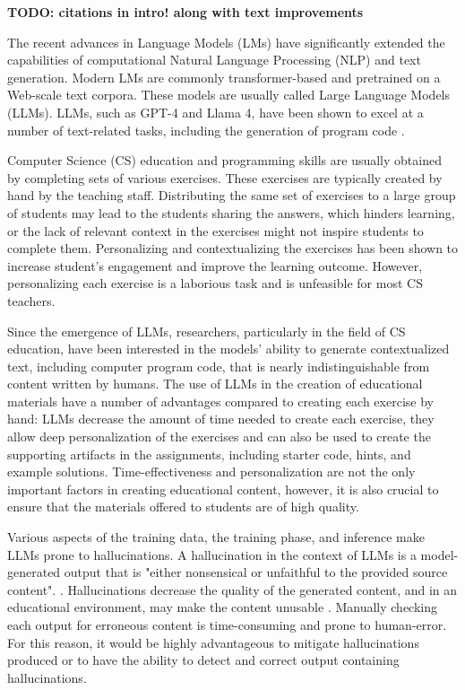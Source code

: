 \documentclass[english, 12pt, a4paper, sci, utf8, a-2b, online]{../definitions/aaltothesis}
\begin{document}
\textbf{TODO: citations in intro! along with text improvements }

The recent advances in Language Models (LMs) have significantly extended the capabilities of computational Natural Language Processing (NLP) and text generation. Modern LMs are commonly transformer-based and pretrained on a Web-scale text corpora. These models are usually called Large Language Models (LLMs). LLMs, such as GPT-4 and Llama 4, have been shown to excel at a number of text-related tasks, including the generation of program code \cite{Minaee2024-fr}.

Computer Science (CS) education and programming skills are usually obtained by completing sets of various exercises. These exercises are typically created by hand by the teaching staff. Distributing the same set of exercises to a large group of students may lead to the students sharing the answers, which hinders learning, or the lack of relevant context in the exercises might not inspire students to complete them. Personalizing and contextualizing the exercises has been shown to increase student's engagement and improve the learning outcome. However, personalizing each exercise is a laborious task and is unfeasible for most CS teachers.

Since the emergence of LLMs, researchers, particularly in the field of CS education, have been interested in the models' ability to generate contextualized text, including computer program code, that is nearly indistinguishable from content written by humans. The use of LLMs in the creation of educational materials have a number of advantages compared to creating each exercise by hand: LLMs decrease the amount of time needed to create each exercise, they allow deep personalization of the exercises and can also be used to create the supporting artifacts in the assignments, including starter code, hints, and example solutions. Time-effectiveness and personalization are not the only important factors in creating educational content, however, it is also crucial to ensure that the materials offered to students are of high quality.

Various aspects of the training data, the training phase, and inference make LLMs prone to hallucinations. A hallucination in the context of LLMs is a model-generated output that is "either
nonsensical or unfaithful to the provided source content". \cite{10.1145/3703155}. Hallucinations decrease the quality of the generated content, and in an educational environment, may make the content unusable \cite{10.1145/3769994.3770036}. Manually checking each output for erroneous content is time-consuming and prone to human-error. For this reason, it would be highly advantageous to mitigate hallucinations produced or to have the ability to detect and correct output containing hallucinations. 
\end{document}
